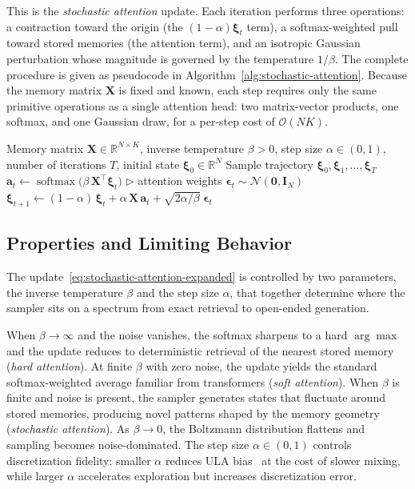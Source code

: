 This is the \emph{stochastic attention} update. Each iteration performs three operations: a contraction toward the origin (the $(1-\alpha)\boldsymbol{\xi}_t$ term), a softmax-weighted pull toward stored memories (the attention term), and an isotropic Gaussian perturbation whose magnitude is governed by the temperature $1/\beta$. The complete procedure is given as pseudocode in Algorithm~\ref{alg:stochastic-attention}. Because the memory matrix $\mathbf{X}$ is fixed and known, each step requires only the same primitive operations as a single attention head: two matrix-vector products, one softmax, and one Gaussian draw, for a per-step cost of $\mathcal{O}(NK)$.


\begin{algorithm}[t]
\caption{Stochastic Attention Sampler}\label{alg:stochastic-attention}
\begin{algorithmic}[1]
\REQUIRE Memory matrix $\mathbf{X}\in\mathbb{R}^{N\times K}$, inverse temperature $\beta>0$, step size $\alpha\in(0,1)$, number of iterations $T$, initial state $\boldsymbol{\xi}_0\in\mathbb{R}^N$
\ENSURE Sample trajectory $\boldsymbol{\xi}_0,\boldsymbol{\xi}_1,\dots,\boldsymbol{\xi}_T$
    \STATE $\mathbf{a}_t \leftarrow \operatorname{softmax}\!\bigl(\beta\,\mathbf{X}^{\top}\boldsymbol{\xi}_t\bigr)$ \hfill $\triangleright$ attention weights
    \STATE $\boldsymbol{\epsilon}_t \sim \mathcal{N}(\mathbf{0},\mathbf{I}_N)$
    \STATE $\boldsymbol{\xi}_{t+1} \leftarrow (1-\alpha)\,\boldsymbol{\xi}_t + \alpha\,\mathbf{X}\,\mathbf{a}_t + \sqrt{2\alpha/\beta}\;\boldsymbol{\epsilon}_t$
\ENDFOR
\end{algorithmic}
\end{algorithm}

\subsection{Properties and Limiting Behavior}
The update~\eqref{eq:stochastic-attention-expanded} is controlled by two parameters, the inverse temperature $\beta$ and the step size $\alpha$, that together determine where the sampler sits on a spectrum from exact retrieval to open-ended generation.

When $\beta\to\infty$ and the noise vanishes, the softmax sharpens to a hard $\arg\max$ and the update reduces to deterministic retrieval of the nearest stored memory (\emph{hard attention}). At finite $\beta$ with zero noise, the update yields the standard softmax-weighted average familiar from transformers (\emph{soft attention}). When $\beta$ is finite and noise is present, the sampler generates states that fluctuate around stored memories, producing novel patterns shaped by the memory geometry (\emph{stochastic attention}). As $\beta\to 0$, the Boltzmann distribution flattens and sampling becomes noise-dominated. The step size $\alpha\in(0,1)$ controls discretization fidelity: smaller $\alpha$ reduces ULA bias~\cite{durmusNonasymptoticAnalysisUnadjusted2017} at the cost of slower mixing, while larger $\alpha$ accelerates exploration but increases discretization error.

